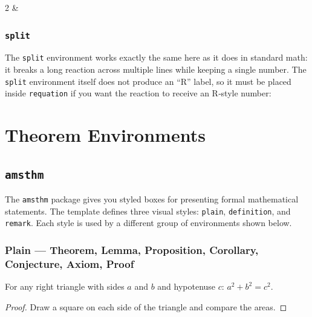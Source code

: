 \begin{ralignat}{2}
	 &\qquad {}
	\label{rxn:alignat}
\end{ralignat}

\subsubsection{\texttt{split}}
The \texttt{split} environment works exactly the same here as it does in standard math: it breaks a long reaction across multiple lines while keeping a single number. The \texttt{split} environment itself does not produce an “R” label, so it must be placed inside \texttt{requation} if you want the reaction to receive an R‑style number:

\begin{requation}
	\begin{split}
	\end{split}
\end{requation}

\section{Theorem Environments}

\subsection{\texttt{amsthm}}
The \texttt{amsthm} package gives you styled boxes for presenting formal mathematical statements. The template defines three visual styles: \texttt{plain}, \texttt{definition}, and \texttt{remark}. Each style is used by a different group of environments shown below.

\subsubsection{Plain --- Theorem, Lemma, Proposition, Corollary, Conjecture, Axiom, Proof}

\begin{theorem}
	\label{thm:pythagorean}
	For any right triangle with sides $a$ and $b$ and hypotenuse $c$:
	$a^2 + b^2 = c^2$.
\end{theorem}

\begin{proof}
	Draw a square on each side of the triangle and compare the areas.
\end{proof}

